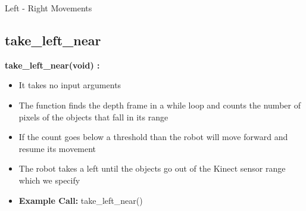 \documentclass[10pt, a4paper]{beamer}
\begin{document}
\begin{frame}[allowframebreaks]{Left - Right Movements}
  \subsection{take\_left\_near}
    \textbf{take\_left\_near(void) : }
      \begin{itemize}
       \item It takes no input arguments
       \item The function finds the depth frame in a while loop and counts the number of pixels of the objects that fall in its range
       \item If the count goes below a threshold than the robot will move forward and resume its movement
       \item The robot takes a left until the objects go out of the Kinect sensor range which we specify
       \item \textbf{Example Call:} take\_left\_near()
      \end{itemize}
\end{frame}
\end{document}
